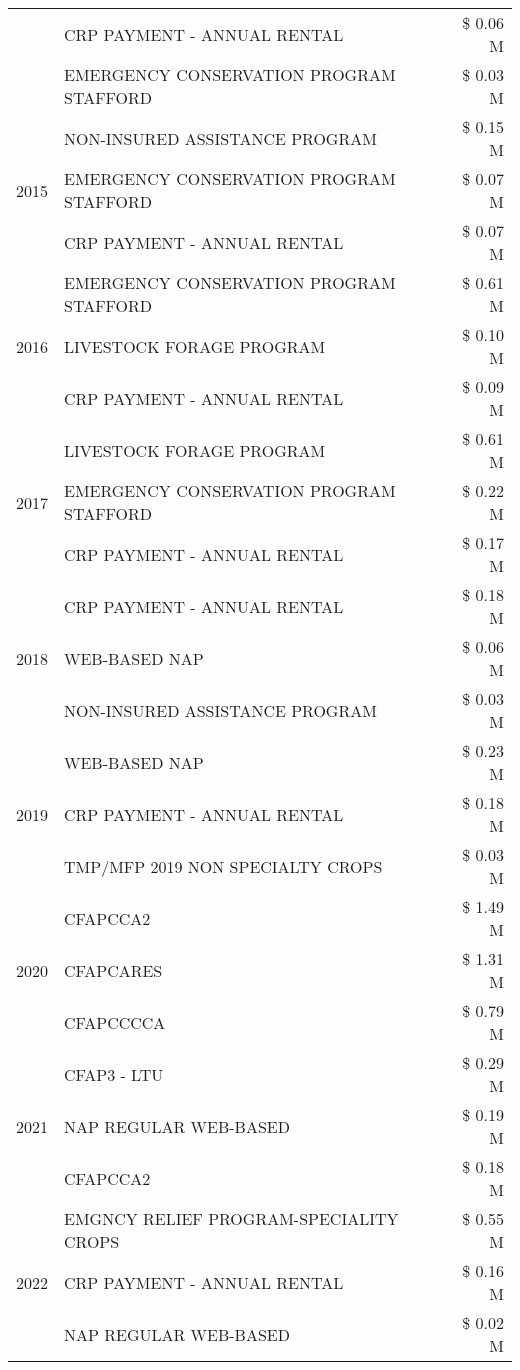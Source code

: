 \begin{tabular}{llr}
 & CRP PAYMENT - ANNUAL RENTAL & \$ 0.06 M \\
 & EMERGENCY CONSERVATION PROGRAM STAFFORD & \$ 0.03 M \\
\cline{1-3}
\multirow[t]{3}{*}{2015} & NON-INSURED ASSISTANCE PROGRAM & \$ 0.15 M \\
 & EMERGENCY CONSERVATION PROGRAM STAFFORD & \$ 0.07 M \\
 & CRP PAYMENT - ANNUAL RENTAL & \$ 0.07 M \\
\cline{1-3}
\multirow[t]{3}{*}{2016} & EMERGENCY CONSERVATION PROGRAM STAFFORD & \$ 0.61 M \\
 & LIVESTOCK FORAGE PROGRAM & \$ 0.10 M \\
 & CRP PAYMENT - ANNUAL RENTAL & \$ 0.09 M \\
\cline{1-3}
\multirow[t]{3}{*}{2017} & LIVESTOCK FORAGE PROGRAM & \$ 0.61 M \\
 & EMERGENCY CONSERVATION PROGRAM STAFFORD & \$ 0.22 M \\
 & CRP PAYMENT - ANNUAL RENTAL & \$ 0.17 M \\
\cline{1-3}
\multirow[t]{3}{*}{2018} & CRP PAYMENT - ANNUAL RENTAL & \$ 0.18 M \\
 & WEB-BASED NAP & \$ 0.06 M \\
 & NON-INSURED ASSISTANCE PROGRAM & \$ 0.03 M \\
\cline{1-3}
\multirow[t]{3}{*}{2019} & WEB-BASED NAP & \$ 0.23 M \\
 & CRP PAYMENT - ANNUAL RENTAL & \$ 0.18 M \\
 & TMP/MFP 2019 NON SPECIALTY CROPS & \$ 0.03 M \\
\cline{1-3}
\multirow[t]{3}{*}{2020} & CFAPCCA2 & \$ 1.49 M \\
 & CFAPCARES & \$ 1.31 M \\
 & CFAPCCCCA & \$ 0.79 M \\
\cline{1-3}
\multirow[t]{3}{*}{2021} & CFAP3 - LTU & \$ 0.29 M \\
 & NAP REGULAR WEB-BASED & \$ 0.19 M \\
 & CFAPCCA2 & \$ 0.18 M \\
\cline{1-3}
\multirow[t]{3}{*}{2022} & EMGNCY RELIEF PROGRAM-SPECIALITY CROPS & \$ 0.55 M \\
 & CRP PAYMENT - ANNUAL RENTAL & \$ 0.16 M \\
 & NAP REGULAR WEB-BASED & \$ 0.02 M \\
\cline{1-3}
\bottomrule
\end{tabular}

